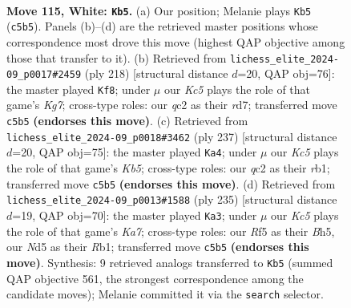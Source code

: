 \documentclass[11pt]{article}
\begin{document}
\clearpage

\begin{figure}[p]\centering
\begin{subfigure}{0.46\textwidth}\centering
\resizebox{\linewidth}{!}{%
\newchessgame
\chessboard[
  setfen={3B4/1k6/8/2KN1R2/8/8/2q5/8 w - - 6 115},
  showmover=false,
  pgfstyle=straightmove, color=movearrow, markmove={c5-b5}
]}
\caption{}
\end{subfigure}\hfill
\begin{subfigure}{0.46\textwidth}\centering
\resizebox{\linewidth}{!}{%
\newchessgame
\chessboard[
  setfen={6N1/3r2K1/8/5k2/8/8/8/8 w - - 68 110},
  showmover=false,
  pgfstyle=straightmove, color=movearrow, markmove={g7-f8}
]}
\caption{}
\end{subfigure}
\\[4pt]
\begin{subfigure}{0.46\textwidth}\centering
\resizebox{\linewidth}{!}{%
\newchessgame
\chessboard[
  setfen={8/8/8/1n6/1k6/3K4/8/1R6 b - - 98 119},
  showmover=false,
  pgfstyle=straightmove, color=movearrow, markmove={b4-a4}
]}
\caption{}
\end{subfigure}\hfill
\begin{subfigure}{0.46\textwidth}\centering
\resizebox{\linewidth}{!}{%
\newchessgame
\chessboard[
  setfen={8/8/8/2K4b/8/8/k2Q4/1r6 b - - 73 118},
  showmover=false,
  pgfstyle=straightmove, color=movearrow, markmove={a2-a3}
]}
\caption{}
\end{subfigure}
\caption{\textbf{Move 115, White: \texttt{Kb5}.} (a) Our position; Melanie plays \texttt{Kb5} (\texttt{c5b5}). Panels (b)--(d) are the retrieved master positions whose correspondence most drove this move (highest QAP objective among those that transfer to it). (b) Retrieved from \texttt{lichess\_elite\_2024-09\_p0017\#2459} (ply 218) [structural distance $d$=20, QAP obj=76]: the master played \texttt{Kf8}; under $\mu$ our \emph{Kc5} plays the role of that game's \emph{Kg7}; cross-type roles: our \emph{q}c2 as their \emph{r}d7; transferred move \texttt{c5b5} \textbf{(endorses this move)}. (c) Retrieved from \texttt{lichess\_elite\_2024-09\_p0018\#3462} (ply 237) [structural distance $d$=20, QAP obj=75]: the master played \texttt{Ka4}; under $\mu$ our \emph{Kc5} plays the role of that game's \emph{Kb5}; cross-type roles: our \emph{q}c2 as their \emph{r}b1; transferred move \texttt{c5b5} \textbf{(endorses this move)}. (d) Retrieved from \texttt{lichess\_elite\_2024-09\_p0013\#1588} (ply 235) [structural distance $d$=19, QAP obj=70]: the master played \texttt{Ka3}; under $\mu$ our \emph{Kc5} plays the role of that game's \emph{Ka7}; cross-type roles: our \emph{R}f5 as their \emph{B}h5, our \emph{N}d5 as their \emph{R}b1; transferred move \texttt{c5b5} \textbf{(endorses this move)}. Synthesis: 9 retrieved analogs transferred to \texttt{Kb5} (summed QAP objective 561, the strongest correspondence among the candidate moves); Melanie committed it via the \texttt{search} selector.}
\label{fig:thought-m228}
\end{figure}
\end{document}
